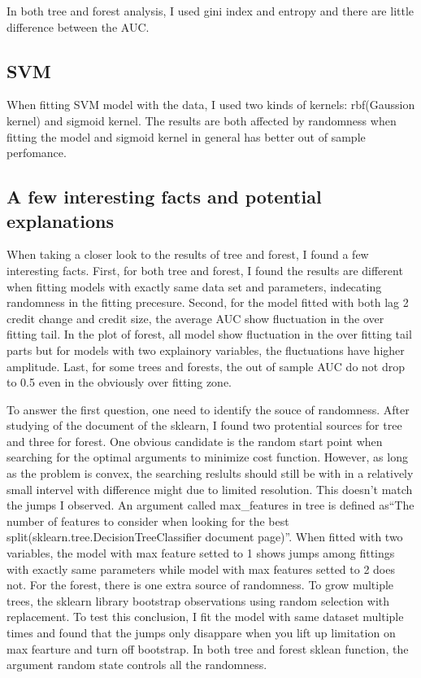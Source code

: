 \documentclass{article}
\begin{document}
In both tree and forest analysis, I used gini index and entropy and
there are little difference between the AUC.

\subsection*{SVM}

When fitting SVM model with the data, I used two kinds of kernels:
rbf(Gaussion kernel) and sigmoid kernel. The results are both affected
by randomness when fitting the model and sigmoid kernel in general has
better out of sample perfomance. 


\subsection*{A few interesting facts and potential explanations}


When taking a closer look to the results of tree and forest, I found a
few interesting facts. First, for both tree and forest, I found the
results are different when fitting models with exactly same data set and
parameters, indecating randomness in the
fitting precesure. Second, for the
model fitted with both lag 2 credit change and credit size, the average
AUC show fluctuation in the over fitting tail. In the plot of forest,
all model show fluctuation in the over fitting tail parts but for models
with two explainory variables, the fluctuations have higher amplitude.
Last, for some trees and forests, the out
of sample AUC do not drop to 0.5 even in the obviously over fitting
zone.

To answer the first question, one need to identify the souce of
randomness. After studying of the document of
the sklearn, I found two protential sources for tree and three for
forest. One obvious candidate is the random start point when searching
for the optimal arguments to minimize cost function. However, as long as
the problem is convex, the searching reslults should still be with in a
relatively small intervel with difference might due to limited resolution. This
doesn't match the jumps I observed. An argument
called max\_features in tree is defined as``The number of features to consider when
looking for the best split(sklearn.tree.DecisionTreeClassifier document
page)''. When fitted with two variables, the model with max
feature setted to 1 shows jumps among fittings with exactly same
parameters while model with max features setted to 2 does not. For the forest, there is one extra
source of randomness. To grow multiple trees, the sklearn library
bootstrap observations using random selection with replacement. To test
this conclusion, I fit the model with same dataset multiple times and
found that the jumps only disappare when you lift up limitation on max
fearture and turn off bootstrap. In both tree and forest sklean
function, the argument random state controls all the
randomness.
\end{document}
